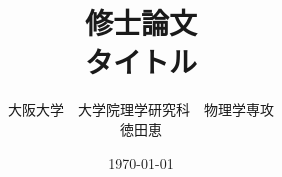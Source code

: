 \title{\Huge 修士論文\\[1cm]
  \huge タイトル\\[1cm]}
\author{\Large 大阪大学　大学院理学研究科　物理学専攻\\
  \Large 徳田恵\\[0.5cm]}
\date{\Large \today}